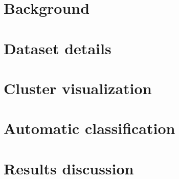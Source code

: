 \documentclass[
A4paper,                %
twoside,                %
openright,              %
chapterprefix=true,     %
12pt,                   %
headings=normal,        %
titlepage=on            %
]{book}
\begin{document}
\frontmatter
\pagestyle{empty}				    %

\newpage

\pagestyle{plain}				    %




\newpage

\setcounter{tocdepth}{3}		%
\tableofcontents				%
\newpage

\listoffigures
\newpage

\listoftables
\newpage


\cleardoublepage


\part{Background}



\part{Dataset details}

\part{Cluster visualization}



\part{Automatic classification}


\part{Results discussion}





\nocite{*}
\end{document}
